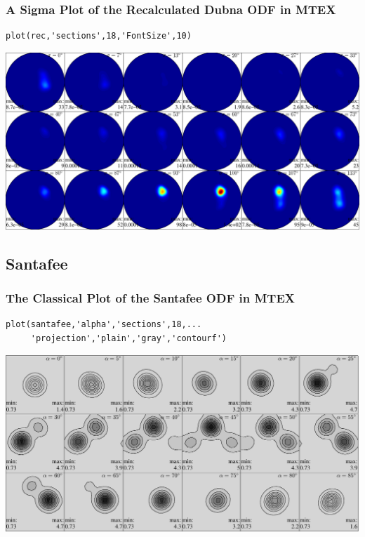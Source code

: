 \documentclass{beamer}
\newcommand{\MTEX}{{\bf {\color{red}M}TEX\,}}%
\begin{document}
\begin{frame}[fragile]
  \frametitle{A Sigma Plot of the Recalculated Dubna ODF in \MTEX}

\begin{lstlisting}
plot(rec,'sections',18,'FontSize',10)
\end{lstlisting}

\medskip

\includegraphics[width=\textwidth]{pic/ODFso9}
  
\end{frame}

\subsection*{Santafee}

\begin{frame}[fragile]
  \frametitle{The Classical Plot of the Santafee ODF in \MTEX}

\begin{lstlisting}
plot(santafee,'alpha','sections',18,...
     'projection','plain','gray','contourf')
\end{lstlisting}

\includegraphics[width=\textwidth]{pic/santafee}
  
\end{frame}
\end{document}
